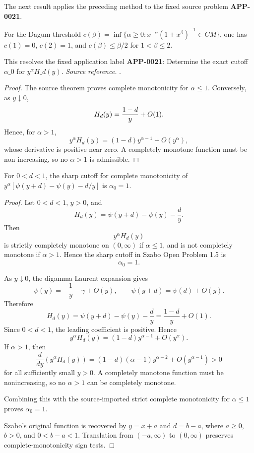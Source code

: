 The next result applies the preceding method to the fixed source problem \textbf{APP-0021}.
\begin{corollary}[APP-0021: Szabo's cutoff problem has \(\alpha\_0=1\)]
\label{res:dagum-c-endpoints-and-upper-gate}
For the Dagum threshold \(c(\beta)=\inf\{\alpha\ge0:x^{-\alpha}(1+x^\beta)^{-1}\in CM\}\), one has \(c(1)=0\), \(c(2)=1\), and \(c(\beta)\le\beta/2\) for \(1<\beta\le2\).

This resolves the fixed application label \textbf{APP-0021}: Determine the exact cutoff \(\alpha\_0\) for \(y^\alpha H\_d(y)\).
\emph{Source reference.} \cite{app-app-0021-source}.
\end{corollary}
\begin{proof}
The source theorem proves complete monotonicity for \(\alpha\le1\).  Conversely,
as \(y\downarrow0\),
\[
  H_d(y)={1-d\over y}+O(1).
\]
Hence, for \(\alpha>1\),
\[
  y^\alpha H_d(y)=(1-d)y^{\alpha-1}+O(y^\alpha),
\]
whose derivative is positive near zero.  A completely monotone function must be
non-increasing, so no \(\alpha>1\) is admissible.
\end{proof}

\begin{lemma}
\label{res:szabo-psi-difference-alpha0-exact-one}
For \(0<d<1\), the sharp cutoff for complete monotonicity of \(y^\alpha[\psi(y+d)-\psi(y)-d/y]\) is \(\alpha_0=1\).
\end{lemma}
\begin{proof}
Let \(0<d<1\), \(y>0\), and
\[
H_d(y)=\psi(y+d)-\psi(y)-\frac{d}{y}.
\]
Then
\[
y^\alpha H_d(y)
\]
is strictly completely monotone on \((0,\infty)\) if \(\alpha\le 1\), and is not completely monotone if \(\alpha>1\). Hence the sharp cutoff in Szabo Open Problem 1.5 is
\[
\alpha_0=1.
\]

As \(y\downarrow0\), the digamma Laurent expansion gives
\[
\psi(y)=-\frac1y-\gamma+O(y),
\qquad
\psi(y+d)=\psi(d)+O(y).
\]
Therefore
\[
H_d(y)=\psi(y+d)-\psi(y)-\frac{d}{y}
=\frac{1-d}{y}+O(1).
\]
Since \(0<d<1\), the leading coefficient is positive. Hence
\[
y^\alpha H_d(y)=(1-d)y^{\alpha-1}+O(y^\alpha).
\]
If \(\alpha>1\), then
\[
\frac{d}{dy}\left(y^\alpha H_d(y)\right)
=(1-d)(\alpha-1)y^{\alpha-2}+O(y^{\alpha-1})>0
\]
for all sufficiently small \(y>0\). A completely monotone function must be nonincreasing, so no \(\alpha>1\) can be completely monotone.

Combining this with the source-imported strict complete monotonicity for \(\alpha\le1\) proves \(\alpha_0=1\).

Szabo's original function is recovered by \(y=x+a\) and \(d=b-a\), where \(a\ge0\), \(b>0\), and \(0<b-a<1\). Translation from \((-a,\infty)\) to \((0,\infty)\) preserves complete-monotonicity sign tests.
\end{proof}

